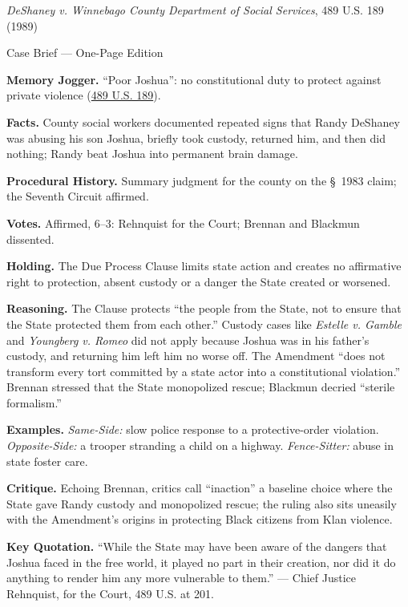 \documentclass[12pt]{article}
\begin{document}
\begin{center}
{\Large \textit{DeShaney v. Winnebago County Department of Social Services}, 489 U.S. 189 (1989)\par}
\vspace{0.3em}
{\normalsize Case Brief --- One-Page Edition\par}
\end{center}

\textbf{Memory Jogger.} ``Poor Joshua'': no constitutional duty to protect against private violence (\href{https://supreme.justia.com/cases/federal/us/489/189/}{489 U.S. 189}).

\textbf{Facts.} County social workers documented repeated signs that Randy DeShaney was abusing his son Joshua, briefly took custody, returned him, and then did nothing; Randy beat Joshua into permanent brain damage.

\textbf{Procedural History.} Summary judgment for the county on the \S~1983 claim; the Seventh Circuit affirmed.

\textbf{Votes.} Affirmed, 6--3: Rehnquist for the Court; Brennan and Blackmun dissented.

\textbf{Holding.} The Due Process Clause limits state action and creates no affirmative right to protection, absent custody or a danger the State created or worsened.

\textbf{Reasoning.} The Clause protects ``the people from the State, not to ensure that the State protected them from each other.'' Custody cases like \textit{Estelle v. Gamble} and \textit{Youngberg v. Romeo} did not apply because Joshua was in his father's custody, and returning him left him no worse off. The Amendment ``does not transform every tort committed by a state actor into a constitutional violation.'' Brennan stressed that the State monopolized rescue; Blackmun decried ``sterile formalism.''

\textbf{Examples.} \emph{Same-Side:} slow police response to a protective-order violation. \emph{Opposite-Side:} a trooper stranding a child on a highway. \emph{Fence-Sitter:} abuse in state foster care.

\textbf{Critique.} Echoing Brennan, critics call ``inaction'' a baseline choice where the State gave Randy custody and monopolized rescue; the ruling also sits uneasily with the Amendment's origins in protecting Black citizens from Klan violence.

\textbf{Key Quotation.} ``While the State may have been aware of the dangers that Joshua faced in the free world, it played no part in their creation, nor did it do anything to render him any more vulnerable to them.'' --- Chief Justice Rehnquist, for the Court, 489 U.S. at 201.
\end{document}

